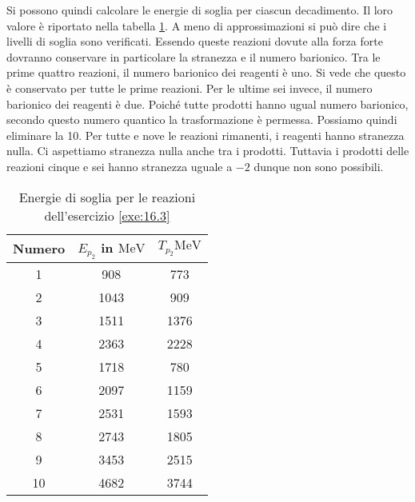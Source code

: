 \documentclass[../main.tex]{subfiles}
\begin{document}
\begin{svol}
\begin{table}[h]
		\end{table}
		Si possono quindi calcolare le energie di soglia per ciascun decadimento. Il loro valore è riportato nella tabella \ref{tbl:ensog}.
		A meno di approssimazioni si può dire che i livelli di soglia sono verificati. Essendo queste reazioni dovute alla forza forte dovranno conservare in particolare la stranezza e il numero barionico. Tra le prime quattro reazioni, il numero barionico dei reagenti è uno. Si vede che questo è conservato per tutte le prime reazioni. Per le ultime sei invece, il numero barionico dei reagenti è due. Poiché tutte prodotti hanno ugual numero barionico, secondo questo numero quantico la trasformazione è permessa. Possiamo quindi eliminare la 10. Per tutte e nove le reazioni rimanenti, i reagenti hanno stranezza nulla. Ci aspettiamo stranezza nulla anche tra i prodotti. Tuttavia i prodotti delle reazioni cinque e sei hanno stranezza uguale a $ -2 $ dunque non sono possibili.
	\end{svol}
\newpage
\begin{table}[h]
	\centering
	\caption{Energie di soglia per le reazioni dell'esercizio \ref{exe:16.3}}
	\label{tbl:ensog}
	\begin{tabular}{c|cc}
		Numero & $ E_{p_{2}} $ in $ \si{\mega\electronvolt} $  & $ T_{p_{2}}\si{\mega\electronvolt} $ \\\hline{\tiny }
		1 & 908 & 773 \\
		2 & 1043 & 909 \\
		3 & 1511 & 1376 \\
		4 & 2363 & 2228 \\
		5 & 1718 & 780 \\
		6 & 2097 & 1159 \\
		7 & 2531 & 1593 \\
		8 & 2743 & 1805 \\
		9 & 3453 & 2515 \\
		10 & 4682 & 3744 \\
	\end{tabular}
\end{table}
\end{document}
